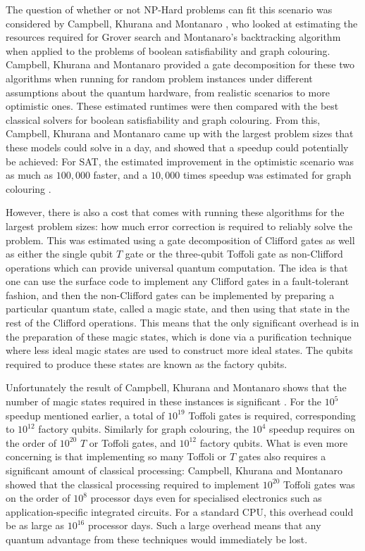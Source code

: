 The question of whether or not NP-Hard problems can fit this scenario was considered by Campbell, Khurana and Montanaro \cite{campbell2019}, who looked at estimating the resources required for Grover search and Montanaro's backtracking algorithm when applied to the problems of boolean satisfiability and graph colouring. Campbell, Khurana and Montanaro provided a gate decomposition for these two algorithms when running for random problem instances under different assumptions about the quantum hardware, from realistic scenarios to more optimistic ones. These estimated runtimes were then compared with the best classical solvers for boolean satisfiability and graph colouring. From this, Campbell, Khurana and Montanaro came up with the largest problem sizes that these models could solve in a day, and showed that a speedup could potentially be achieved: For SAT, the estimated improvement in the optimistic scenario was as much as $100,000$ faster, and a $10,000$ times speedup was estimated for graph colouring \cite{campbell2019}.

However, there is also a cost that comes with running these algorithms for the largest problem sizes: how much error correction is required to reliably solve the problem. This was estimated using a gate decomposition of Clifford gates as well as either the single qubit $T$ gate or the three-qubit Toffoli gate as non-Clifford operations which can provide universal quantum computation. The idea is that one can use the surface code to implement any Clifford gates in a fault-tolerant fashion, and then the non-Clifford gates can be implemented by preparing a particular quantum state, called a magic state, and then using that state in the rest of the Clifford operations. This means that the only significant overhead is in the preparation of these magic states, which is done via a purification technique where less ideal magic states are used to construct more ideal states. The qubits required to produce these states are known as the factory qubits.

Unfortunately the result of Campbell, Khurana and Montanaro shows that the number of magic states required in these instances is significant \cite{campbell2019}. For the $10^5$ speedup mentioned earlier, a total of $10^{19}$ Toffoli gates is required, corresponding to $10^{12}$ factory qubits. Similarly for graph colouring, the $10^4$ speedup requires on the order of $10^{20}$ $T$ or Toffoli gates, and $10^{12}$ factory qubits. What is even more concerning is that implementing so many Toffoli or $T$ gates also requires a significant amount of classical processing: Campbell, Khurana and Montanaro showed that the classical processing required to implement $10^{20}$ Toffoli gates was on the order of $10^8$ processor days even for specialised electronics such as application-specific integrated circuits. For a standard CPU, this overhead could be as large as $10^{16}$ processor days. Such a large overhead means that any quantum advantage from these techniques would immediately be lost.

